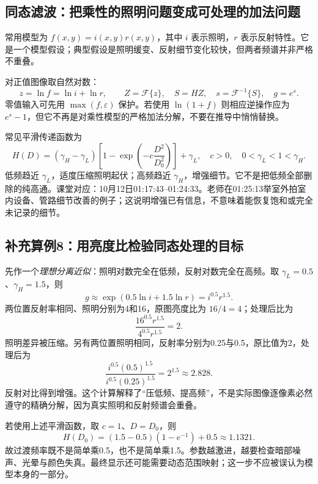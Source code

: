 \subsection{同态滤波：把乘性的照明问题变成可处理的加法问题}
常用模型为 $f(x,y)=i(x,y)r(x,y)$，其中 $i$ 表示照明，$r$ 表示反射特性。它是一个模型假设；典型假设是照明缓变、反射细节变化较快，但两者频谱并非严格不重叠。

对正值图像取自然对数：
\[
z=\ln f=\ln i+\ln r,\qquad
Z=\mathcal F\{z\},\quad S=HZ,\quad
s=\mathcal F^{-1}\{S\},\quad g=e^s.
\]
零值输入可先用 $\max(f,\varepsilon)$ 保护。若使用 $\ln(1+f)$ 则相应逆操作应为 $e^s-1$，但它不再是对乘性模型的严格加法分解，不要在推导中悄悄替换。

常见平滑传递函数为
\[
H(D)=(\gamma_H-\gamma_L)
\left[1-\exp\left(-c\frac{D^2}{D_0^2}\right)\right]+\gamma_L,
\quad c>0,\quad 0<\gamma_L<1<\gamma_H.
\]
低频趋近 $\gamma_L$，适度压缩照明起伏；高频趋近 $\gamma_H$，增强细节。它不是把低频全部删除的纯高通。课堂对应：10月12日01:17:43--01:24:33。老师在01:25:13举室外拍室内设备、管路细节改善的例子；这说明增强已有信息，不意味着能恢复饱和或完全未记录的细节。

\subsection{补充算例8：用亮度比检验同态处理的目标}
先作一个\emph{理想分离近似}：照明对数完全在低频，反射对数完全在高频。取 $\gamma_L=0.5$、$\gamma_H=1.5$，则
\[
g\approx\exp(0.5\ln i+1.5\ln r)=i^{0.5}r^{1.5}.
\]
两位置反射率相同、照明分别为4和16，原图亮度比为 $16/4=4$；处理后比为
\[
\frac{16^{0.5}r^{1.5}}{4^{0.5}r^{1.5}}=2.
\]
照明差异被压缩。另有两位置照明相同，反射率分别为0.25与0.5，原比值为2，处理后为
\[
\frac{i^{0.5}(0.5)^{1.5}}{i^{0.5}(0.25)^{1.5}}=2^{1.5}\approx2.828.
\]
反射对比得到增强。这个计算解释了“压低频、提高频”，不是实际图像逐像素必然遵守的精确分解，因为真实照明和反射频谱会重叠。

若使用上述平滑函数，取 $c=1$、$D=D_0$，则
\[
H(D_0)=(1.5-0.5)(1-e^{-1})+0.5\approx1.1321.
\]
故过渡频率既不是简单乘0.5，也不是简单乘1.5。参数越激进，越要检查暗部噪声、光晕与颜色失真。最终显示还可能需要动态范围映射；这一步不应被误认为模型本身的一部分。

